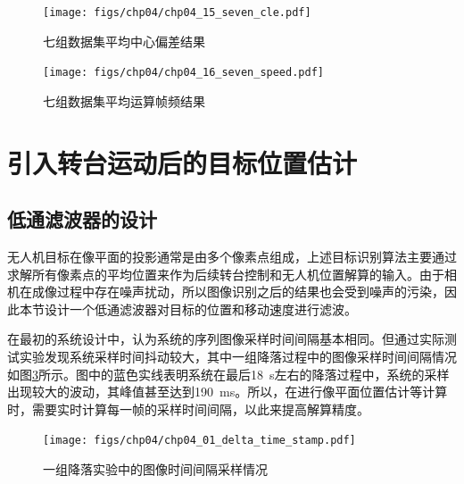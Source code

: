 \begin{figure}[ht]   
	\centering
	\texttt{[image: figs/chp04/chp04\_15\_seven\_cle.pdf]}
	\caption{七组数据集平均中心偏差结果}
	\label{fig:chp04_15_seven_cle}
\end{figure}

\begin{figure}[ht]   
	\centering
	\texttt{[image: figs/chp04/chp04\_16\_seven\_speed.pdf]}
	\caption{七组数据集平均运算帧频结果}
	\label{fig:chp04_16_seven_speed}
\end{figure}


\section{引入转台运动后的目标位置估计}
\subsection{低通滤波器的设计}
无人机目标在像平面的投影通常是由多个像素点组成，上述目标识别算法主要通过求解所有像素点的平均位置来作为后续转台控制和无人机位置解算的输入。由于相机在成像过程中存在噪声扰动，所以图像识别之后的结果也会受到噪声的污染，因此本节设计一个低通滤波器对目标的位置和移动速度进行滤波。

在最初的系统设计中，认为系统的序列图像采样时间间隔基本相同。但通过实际测试实验发现系统采样时间抖动较大，其中一组降落过程中的图像采样时间间隔情况如图\ref{fig:chp04_01_delta_time_stamp}所示。图中的蓝色实线表明系统在最后18\ s左右的降落过程中，系统的采样出现较大的波动，其峰值甚至达到190\ ms。所以，在进行像平面位置估计等计算时，需要实时计算每一帧的采样时间间隔，以此来提高解算精度。

\begin{figure}[ht]   
	\centering
	\texttt{[image: figs/chp04/chp04\_01\_delta\_time\_stamp.pdf]}
	\caption{一组降落实验中的图像时间间隔采样情况}
	\label{fig:chp04_01_delta_time_stamp}
\end{figure}

